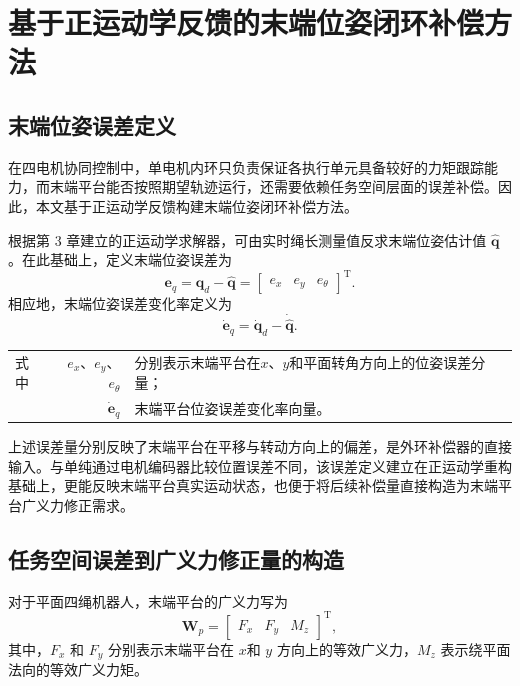 \section{基于正运动学反馈的末端位姿闭环补偿方法}

\subsection{末端位姿误差定义}

在四电机协同控制中，单电机内环只负责保证各执行单元具备较好的力矩跟踪能力，而末端平台能否按照期望轨迹运行，还需要依赖任务空间层面的误差补偿。因此，本文基于正运动学反馈构建末端位姿闭环补偿方法。

根据第 3 章建立的正运动学求解器，可由实时绳长测量值反求末端位姿估计值 $\hat{\bm q}$。在此基础上，定义末端位姿误差为
\begin{equation}
  \bm e_q = \bm q_d-\hat{\bm q} = \begin{bmatrix} e_x & e_y & e_\theta \end{bmatrix}^{\mathrm T}. \label{eq:ch4-task-error}
\end{equation}
相应地，末端位姿误差变化率定义为
\begin{equation}
  \dot{\bm e}_q = \dot{\bm q}_d-\dot{\hat{\bm q}}. \label{eq:ch4-task-edot}
\end{equation}
\begin{tabularx}{\textwidth}{@{}l@{\quad}r@{———}X@{}}
  式中 & $e_x$、$e_y$、$e_\theta$ & 分别表示末端平台在$x$、$y$和平面转角方向上的位姿误差分量；\\
       & $\dot{\bm e}_q$ & 末端平台位姿误差变化率向量。
\end{tabularx}

上述误差量分别反映了末端平台在平移与转动方向上的偏差，是外环补偿器的直接输入。与单纯通过电机编码器比较位置误差不同，该误差定义建立在正运动学重构基础上，更能反映末端平台真实运动状态，也便于将后续补偿量直接构造为末端平台广义力修正需求。

\subsection{任务空间误差到广义力修正量的构造}

对于平面四绳机器人，末端平台的广义力写为
\begin{equation}
  \bm W_p= \begin{bmatrix} F_x & F_y & M_z \end{bmatrix}^{\mathrm T},
\end{equation}
其中，$F_x$ 和 $F_y$ 分别表示末端平台在 $x$和 $y$ 方向上的等效广义力，$M_z$ 表示绕平面法向的等效广义力矩。

